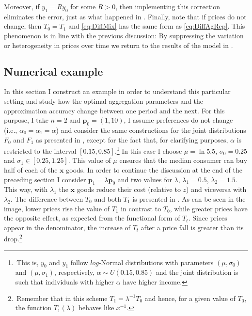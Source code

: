 \documentclass[english, a4paper, 12pt]{article}
\begin{document}
Moreover, if $y_{1} = Ry_{0}$ for some $R>0$, then implementing this correction eliminates the error, just as what happened in . Finally, note that if prices do not change, then $T_{0} = T_{1}$ and \eqref{eq:DiffMix} has the same form as \eqref{eq:DiffAgRep}. This phenomenon is in line with the previous discussion: By suppressing the variation or heterogeneity in prices over time we return to the results of the model in .

\subsection{Numerical example} \label{ssec:Category-Example}
In this section I construct an example in order to understand this particular setting and study how the optimal aggregation parameters and the approximation accuracy change between one period and the next. For this purpose, I take $n = 2$ and $\mathbf{p}_{0} = (1,10)$, I assume preferences do not change (i.e., $\alpha_{0} = \alpha_{1} = \alpha$) and consider the same constructions for the joint distributions $F_{0}$ and $F_{1}$ as presented in , except for the fact that, for clarifying purposes, $\alpha$ is restricted to the interval $[0.15, 0.85]$.\footnote{\,This is, $y_{0}$ and $y_{1}$ follow $log$-Normal distributions with parameters $(\mu, \sigma_{0})$ and $(\mu, \sigma_{1})$, respectively, $\alpha \sim U(0.15, 0.85)$ and the joint distribution is such that individuals with higher $\alpha$ have higher income.} In this case I choose $\mu = \ln 5.5$, $\sigma_{0} = 0.25$ and $\sigma_{1} \in [0.25, 1.25]$. This value of $\mu$ ensures that the median consumer can buy half of each of the $\mathbf{x}$ goods. In order to continue the discussion at the end of the preceding section I consider $\mathbf{p}_{1} = \lambda\mathbf{p}_{0}$ and two values for $\lambda$, $\lambda_{1} = 0.5$, $\lambda_{2} = 1.5$. This way, with $\lambda_{1}$ the $\mathbf{x}$ goods reduce their cost (relative to $z$) and viceversa with $\lambda_{2}$. The difference between $T_{0}$ and both $T_{1}$ is presented in . As can be seen in the image, lower prices rise the value of $T_{1}$ in contrast to $T_{0}$, while greater prices have the opposite effect, as expected from the functional form of $T_{t}$. Since prices appear in the denominator, the increase of $T_{t}$ after a price fall is greater than its drop.\footnote{\,Remember that in this scheme $T_{1} = \lambda^{-1}T_{0}$ and hence, for a given value of $T_{0}$, the function $T_{1}(\lambda)$ behaves like $x^{-1}$.}
\end{document}
